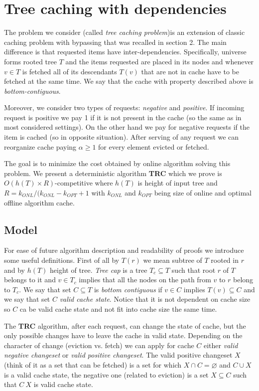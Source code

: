 \section{Tree caching with dependencies}
The problem we consider (called \textit{tree caching problem})is an extension 
of classic caching problem with bypassing that was recalled in section 2. The 
main difference is that requested items have inter-dependencies. Specifically, 
universe forms rooted tree $T$ and the items requested are placed in its nodes 
and whenever $v \in T$ is fetched all of its descendants $T(v)$ that are not in 
cache have to be fetched at the same time. We say that the cache with property 
described above is \textit{bottom-contiguous}.

Moreover, we consider two types of requests: \textit{negative} and 
\textit{positive}. If incoming request is positive we pay 1 if it is 
not present in the cache (so the same as in most considered settings). On the 
other hand we pay for negative requests if the item is cached (so in opposite 
situation). After serving of any request we can reorganize cache paying 
$\alpha \geq 1$ for every element evicted or fetched. 

The goal is to minimize the cost obtained by online algorithm solving this 
problem. We present a deterministic algorithm \textbf{TRC} which we prove is 
$O(h(T) \times R)$-competitive where $h(T)$ is height of input tree and $R = 
k_{ONL}/(k_{ONL} - k_{OPT} +1$ with $k_{ONL}$ and $k_{OPT}$ being size of 
online and optimal offline algorithm cache.

\subsection{Model}

For ease of future algorithm description and readability of proofs we introduce 
some useful definitions. First of all by $T(r)$ we mean subtree of $T$ rooted 
in $r$ and by $h(T)$ height of tree. \textit{Tree cap} is a tree $T_c \subseteq 
T$ such that root $r$ of $T$ belongs to it and $v \in T_c$ implies that all the 
nodes on the path from $v$ to $r$ belong to $T_c$. We say that set $C \subseteq 
T$ is \textit{bottom contiguous} if $v \in C$ implies $T(v) \subseteq C$ and we 
say that set $C$ \textit{valid cache state}. Notice that it is not dependent on 
cache size so $C$ ca be valid cache state and not fit into cache size the same 
time.

The \textbf{TRC} algorithm, after each request, can change the state of cache, 
but the only possible changes have to leave the cache in valid state. 
Depending on the character of change (eviction vs. fetch) we can apply for cache 
$C$ either \textit{valid negative changeset} or \textit{valid positive 
changeset}. The valid positive changeset $X$ (think of it as a set that can be 
fetched) is a set for which $X \cap C = \varnothing$ and $C \cup X$ 
is a valid cache state, the negative one (related to eviction) is a set $X 
\subseteq C$ such that $C \ X$ is valid cache state.

